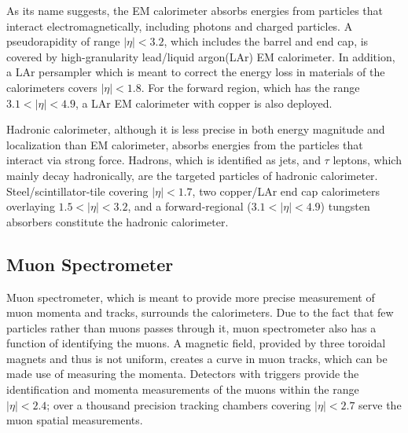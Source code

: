 \documentclass[class=NCU_thesis, crop=false]{standalone}
\begin{document}
		As its name suggests, the EM calorimeter absorbs energies from particles that interact electromagnetically, including photons and charged particles. A pseudorapidity of range $\lvert \eta \rvert < 3.2$, which includes the barrel and end cap, is covered by high-granularity lead/liquid argon(LAr) EM calorimeter. In addition, a LAr persampler which is meant to correct the energy loss in materials of the calorimeters covers $\lvert \eta \rvert < 1.8$. For the forward region, which has the range $3.1 < \lvert \eta \rvert < 4.9$, a LAr EM calorimeter with copper is also deployed.
		
		Hadronic calorimeter, although it is less precise in both energy magnitude and localization than EM calorimeter, absorbs energies from the particles that interact via strong force. Hadrons, which is identified as jets, and $\tau$ leptons, which mainly decay hadronically, are the targeted particles of hadronic calorimeter. Steel/scintillator-tile covering $\lvert \eta \rvert < 1.7$, two copper/LAr end cap calorimeters overlaying $1.5 < \lvert \eta \rvert < 3.2$, and a forward-regional ($3.1 < \lvert \eta \rvert < 4.9$) tungsten absorbers constitute the hadronic calorimeter.
	
	\subsection{Muon Spectrometer}
		Muon spectrometer, which is meant to provide more precise measurement of muon momenta and tracks, surrounds the calorimeters. Due to the fact that few particles rather than muons passes through it, muon spectrometer also has a function of identifying the muons. A magnetic field, provided by three toroidal magnets and thus is not uniform, creates a curve in muon tracks, which can be made use of measuring the momenta. Detectors with triggers provide the identification and momenta measurements of the muons within the range $\lvert \eta \rvert < 2.4$; over a thousand precision tracking chambers covering $\lvert \eta \rvert < 2.7$ serve the muon spatial measurements. 
\end{document}
